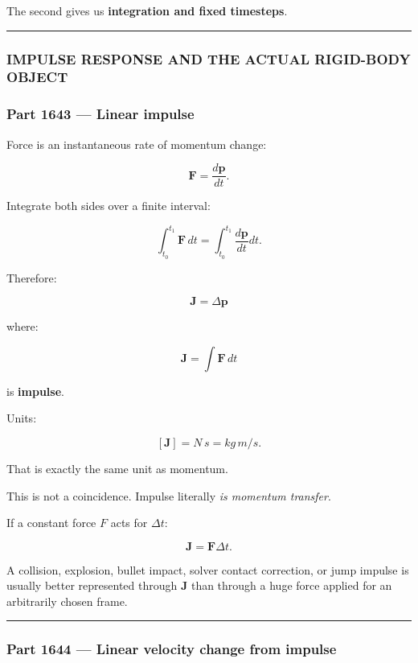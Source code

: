 The second gives us \textbf{integration and fixed timesteps}.

\begin{center}\rule{0.5\linewidth}{0.5pt}\end{center}

\subsubsection{IMPULSE RESPONSE AND THE ACTUAL RIGID-BODY OBJECT}\label{impulse-response-and-the-actual-rigid-body-object}

\subsubsection{Part 1643 --- Linear impulse}\label{part-1643-linear-impulse}

Force is an instantaneous rate of momentum change:

\[
\mathbf F=\frac{d\mathbf p}{dt}.
\]

Integrate both sides over a finite interval:

\[
\int_{t_0}^{t_1}\mathbf F\,dt
=
\int_{t_0}^{t_1}\frac{d\mathbf p}{dt}dt.
\]

Therefore:

\[
\boxed{
\mathbf J
=
\Delta\mathbf p
}
\]

where:

\[
\boxed{
\mathbf J
=
\int\mathbf F\,dt
}
\]

is \textbf{impulse}.

Units:

\[
[\mathbf J]
=
N\,s
=
kg\,m/s.
\]

That is exactly the same unit as momentum.

This is not a coincidence. Impulse literally \emph{is momentum transfer}.

If a constant force \(F\) acts for \(\Delta t\):

\[
\mathbf J
=
\mathbf F\Delta t.
\]

A collision, explosion, bullet impact, solver contact correction, or jump impulse is usually better represented through \(\mathbf J\) than through a huge force applied for an arbitrarily chosen frame.

\begin{center}\rule{0.5\linewidth}{0.5pt}\end{center}

\subsubsection{Part 1644 --- Linear velocity change from impulse}\label{part-1644-linear-velocity-change-from-impulse}

